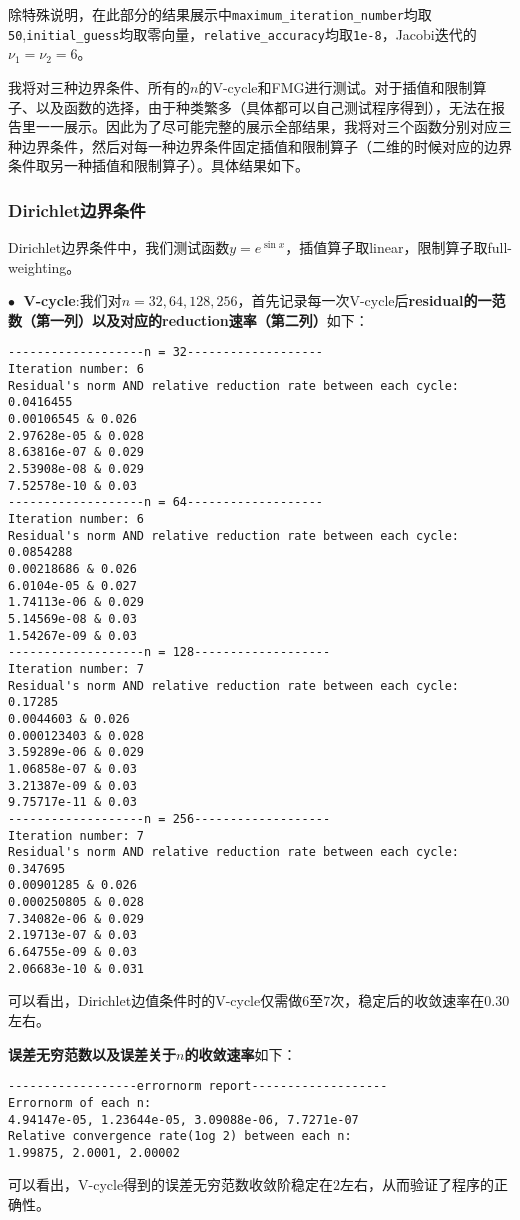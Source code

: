 \documentclass{ctexart}
\begin{document}
\begin{sloppypar}
除特殊说明，在此部分的结果展示中\verb|maximum_iteration_number|均取\verb|50|,\verb|initial_guess|均取零向量，\verb|relative_accuracy|均取\verb|1e-8|，Jacobi迭代的$\nu_1=\nu_2=6$。

我将对三种边界条件、所有的$n$的V-cycle和FMG进行测试。对于插值和限制算子、以及函数的选择，由于种类繁多（具体都可以自己测试程序得到），无法在报告里一一展示。因此为了尽可能完整的展示全部结果，我将对三个函数分别对应三种边界条件，然后对每一种边界条件固定插值和限制算子（二维的时候对应的边界条件取另一种插值和限制算子）。具体结果如下。

\subsubsection{Dirichlet边界条件}
Dirichlet边界条件中，我们测试函数$y=e^{\sin x}$，插值算子取linear，限制算子取full-weighting。

$\bullet \;$ \textbf{V-cycle}:我们对$n=32,64,128,256$，首先记录每一次V-cycle后\textbf{residual的一范数（第一列）以及对应的reduction速率（第二列）}如下：
\begin{shaded}
\begin{verbatim}
-------------------n = 32-------------------
Iteration number: 6
Residual's norm AND relative reduction rate between each cycle: 
0.0416455
0.00106545 & 0.026
2.97628e-05 & 0.028
8.63816e-07 & 0.029
2.53908e-08 & 0.029
7.52578e-10 & 0.03
-------------------n = 64-------------------
Iteration number: 6
Residual's norm AND relative reduction rate between each cycle: 
0.0854288
0.00218686 & 0.026
6.0104e-05 & 0.027
1.74113e-06 & 0.029
5.14569e-08 & 0.03
1.54267e-09 & 0.03
-------------------n = 128-------------------
Iteration number: 7
Residual's norm AND relative reduction rate between each cycle: 
0.17285
0.0044603 & 0.026
0.000123403 & 0.028
3.59289e-06 & 0.029
1.06858e-07 & 0.03
3.21387e-09 & 0.03
9.75717e-11 & 0.03
-------------------n = 256-------------------
Iteration number: 7
Residual's norm AND relative reduction rate between each cycle: 
0.347695
0.00901285 & 0.026
0.000250805 & 0.028
7.34082e-06 & 0.029
2.19713e-07 & 0.03
6.64755e-09 & 0.03
2.06683e-10 & 0.031
\end{verbatim}
\end{shaded}
可以看出，Dirichlet边值条件时的V-cycle仅需做$6$至$7$次，稳定后的收敛速率在$0.30$左右。

\textbf{误差无穷范数以及误差关于$n$的收敛速率}如下：
\begin{shaded}
\begin{verbatim}
------------------errornorm report-------------------
Errornorm of each n: 
4.94147e-05, 1.23644e-05, 3.09088e-06, 7.7271e-07 
Relative convergence rate(1og 2) between each n: 
1.99875, 2.0001, 2.00002
\end{verbatim} 
\end{shaded}
可以看出，V-cycle得到的误差无穷范数收敛阶稳定在$2$左右，从而验证了程序的正确性。


\end{sloppypar}
\end{document}
